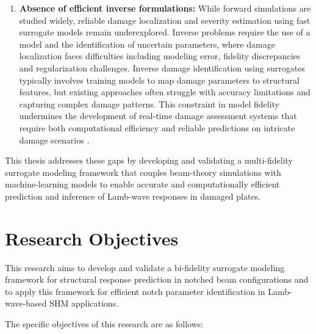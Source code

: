 \documentclass[12pt,a4paper]{report}
\begin{document}
\begin{enumerate}
    \item \textbf{Absence of efficient inverse formulations:} 
While forward simulations are studied widely, reliable damage localization and severity estimation using fast surrogate models remain underexplored. Inverse problems require the use of a model and the identification of uncertain parameters, where damage localization faces difficulties including modeling error, fidelity discrepancies and regularization challenges. Inverse damage identification using surrogates typically involves training models to map damage parameters to structural features, but existing approaches often struggle with accuracy limitations and capturing complex damage patterns. This constraint in model fidelity undermines the development of real-time damage assessment systems that require both computational efficiency and reliable predictions on intricate damage scenarios \citep{DadrasEslamlou2022, doi:10.1098/rsta.2006.1930}.
\end{enumerate}


This thesis addresses these gaps by developing and validating a multi-fidelity surrogate modeling framework that couples beam-theory simulations with machine-learning models to enable accurate and computationally efficient prediction and inference of Lamb-wave responses in damaged plates.

\section{Research Objectives}

This research aims to develop and validate a bi-fidelity surrogate modeling framework for structural response prediction in notched beam configurations and to apply this framework for efficient notch parameter identification in Lamb-wave-based SHM applications.


The specific objectives of this research are as follows:
\end{document}
